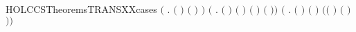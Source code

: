 \begin{SaveVerbatim}{HOLCCSTheoremsTRANSXXcases}
       \ensuremath{(}\HOLSymConst{\HOLTokenExists{}}  . \ensuremath{(} \HOLSymConst{\ensuremath{=}}  \HOLSymConst{\ensuremath{\mid}} \ensuremath{)} \HOLSymConst{\HOLTokenConj{}} \ensuremath{(} \HOLSymConst{\ensuremath{=}}  \HOLSymConst{\ensuremath{\mid}} \ensuremath{)} \HOLSymConst{\HOLTokenConj{}}  \HOLTokenTransBegin{}\HOLTokenTransEnd {}\ensuremath{)} \HOLSymConst{\HOLTokenDisj{}}
       \ensuremath{(}\HOLSymConst{\HOLTokenExists{}}    .
            \ensuremath{(} \HOLSymConst{\ensuremath{=}}  \HOLSymConst{\ensuremath{\mid}} \ensuremath{)} \HOLSymConst{\HOLTokenConj{}} \ensuremath{(} \HOLSymConst{\ensuremath{=}} \HOLConst{\ensuremath{\tau}}\ensuremath{)} \HOLSymConst{\HOLTokenConj{}} \ensuremath{(} \HOLSymConst{\ensuremath{=}}  \HOLSymConst{\ensuremath{\mid}} \ensuremath{)} \HOLSymConst{\HOLTokenConj{}}
             \HOLTokenTransBegin{} \HOLTokenTransEnd {} \HOLSymConst{\HOLTokenConj{}}  \HOLTokenTransBegin{} \ensuremath{(} \ensuremath{)}\HOLTokenTransEnd {}\ensuremath{)} \HOLSymConst{\HOLTokenDisj{}}
       \ensuremath{(}\HOLSymConst{\HOLTokenExists{}}   .
            \ensuremath{(} \HOLSymConst{\ensuremath{=}}   \ensuremath{)} \HOLSymConst{\HOLTokenConj{}} \ensuremath{(} \HOLSymConst{\ensuremath{=}}   \ensuremath{)} \HOLSymConst{\HOLTokenConj{}}  \HOLTokenTransBegin{}\HOLTokenTransEnd {} \HOLSymConst{\HOLTokenConj{}}
            \ensuremath{(}\ensuremath{(} \HOLSymConst{\ensuremath{=}} \HOLConst{\ensuremath{\tau}}\ensuremath{)} \HOLSymConst{\HOLTokenDisj{}} \ensuremath{(} \HOLSymConst{\ensuremath{=}}  \ensuremath{)} \HOLSymConst{\HOLTokenConj{}}  \HOLConst{\HOLTokenNotIn{}}  \HOLSymConst{\HOLTokenConj{}}   \HOLConst{\HOLTokenNotIn{}} \ensuremath{)}\ensuremath{)} \HOLSymConst{\HOLTokenDisj{}}

\end{SaveVerbatim}
